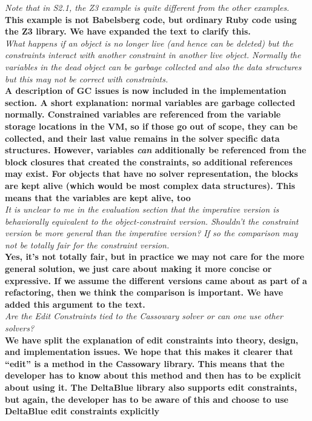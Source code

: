 \documentclass[english]{article}
\begin{document}
\textit{Note that in S2.1, the Z3 example is quite different from the
  other examples.}\\
\textbf{This example is not Babelsberg code, but ordinary Ruby code
  using the Z3 library. We have expanded the text to clarify
  this.}\\

\textit{What happens if an object is no longer live (and hence can be
  deleted) but the constraints interact with another constraint in
  another live object. Normally the variables in the dead object can
  be garbage collected and also the data structures but this may not
  be correct with constraints.}\\
\textbf{A description of GC issues is now included in the
  implementation section. A short explanation: normal variables are
  garbage collected normally. Constrained variables are referenced
  from the variable storage locations in the VM, so if those go out of
  scope, they can be collected, and their last value remains in the
  solver specific data structures. However, variables \emph{can}
  additionally be referenced from the block closures that created the
  constraints, so additional references may exist. For objects that
  have no solver representation, the blocks are kept alive (which
  would be most complex data structures). This means that the
  variables are kept alive, too}\\


\textit{It is unclear to me in the evaluation section that the
  imperative version is behaviorally equivalent to the
  object-constraint version. Shouldn't the constraint version be more
  general than the imperative version?  If so the comparison may not
  be totally fair for the constraint
  version.}\\
\textbf{Yes, it's not totally fair, but in practice we may not care
  for the more general solution, we just care about making it more
  concise or expressive. If we assume the different versions came
  about as part of a refactoring, then we think the comparison is
  important. We
  have added this argument to the text.}\\

\textit{Are the Edit Constraints tied to the Cassowary solver or can
  one use other solvers?}\\
\textbf{We have split the explanation of edit constraints into theory,
  design, and implementation issues. We hope that this makes it
  clearer that ``edit'' is a method in the Cassowary library. This
  means that the developer has to know about this method and then has
  to be explicit about using it. The DeltaBlue library also supports
  edit constraints, but again, the developer has to be aware of this
  and choose to use DeltaBlue edit constraints explicitly}\\

\end{document}
